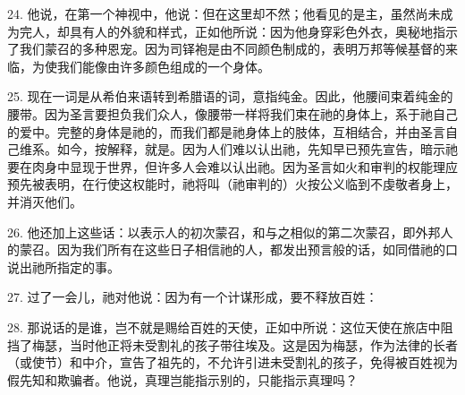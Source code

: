 24. 他说，在第一个神视中，他说：但在这里却不然；他看见的是主，虽然尚未成为完人，却具有人的外貌和样式，正如他所说：因为他身穿彩色外衣，奥秘地指示了我们蒙召的多种恩宠。因为司铎袍是由不同颜色制成的，表明万邦等候基督的来临，为使我们能像由许多颜色组成的一个身体。\par

25. 现在一词是从希伯来语转到希腊语的词，意指纯金。因此，他腰间束着纯金的腰带。因为圣言要担负我们众人，像腰带一样将我们束在祂的身体上，系于祂自己的爱中。完整的身体是祂的，而我们都是祂身体上的肢体，互相结合，并由圣言自己维系。如今，按解释，就是。因为人们难以认出祂，先知早已预先宣告，暗示祂要在肉身中显现于世界，但许多人会难以认出祂。因为圣言如火和审判的权能理应预先被表明，在行使这权能时，祂将叫（祂审判的）火按公义临到不虔敬者身上，并消灭他们。\par

26. 他还加上这些话：以表示人的初次蒙召，和与之相似的第二次蒙召，即外邦人的蒙召。因为我们所有在这些日子相信祂的人，都发出预言般的话，如同借祂的口说出祂所指定的事。\par

27. 过了一会儿，祂对他说：因为有一个计谋形成，要不释放百姓：\par

28. 那说话的是谁，岂不就是赐给百姓的天使，正如中所说：这位天使在旅店中阻挡了梅瑟，当时他正将未受割礼的孩子带往埃及。这是因为梅瑟，作为法律的长者（或使节）和中介，宣告了祖先的，不允许引进未受割礼的孩子，免得被百姓视为假先知和欺骗者。他说，真理岂能指示别的，只能指示真理吗？\par

